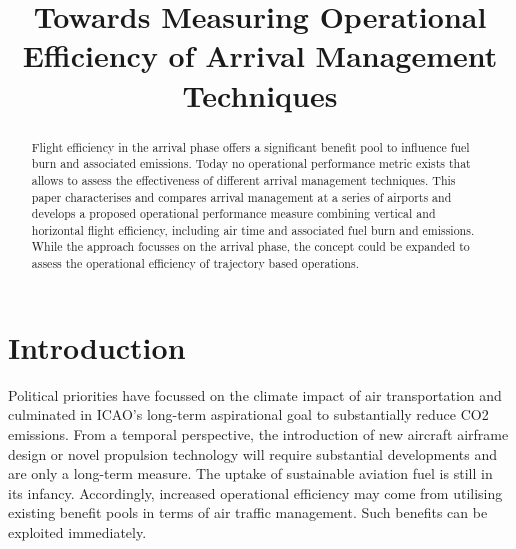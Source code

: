 \documentclass[
  journal,
]{IEEEtran}%
\title{Towards Measuring Operational Efficiency of Arrival Management
Techniques}
\author{

}
\begin{document}


\maketitle

\begin{abstract}
Flight efficiency in the arrival phase offers a significant benefit pool
to influence fuel burn and associated emissions. Today no operational
performance metric exists that allows to assess the effectiveness of
different arrival management techniques. This paper characterises and
compares arrival management at a series of airports and develops a
proposed operational performance measure combining vertical and
horizontal flight efficiency, including air time and associated fuel
burn and emissions. While the approach focusses on the arrival phase,
the concept could be expanded to assess the operational efficiency of
trajectory based operations.
\end{abstract}

%


\section{Introduction}\label{introduction}

Political priorities have focussed on the climate impact of air
transportation and culminated in ICAO's long-term aspirational goal to
substantially reduce CO2 emissions. From a temporal perspective, the
introduction of new aircraft airframe design or novel propulsion
technology will require substantial developments and are only a
long-term measure. The uptake of sustainable aviation fuel is still in
its infancy. Accordingly, increased operational efficiency may come from
utilising existing benefit pools in terms of air traffic management.
Such benefits can be exploited immediately.
\end{document}

